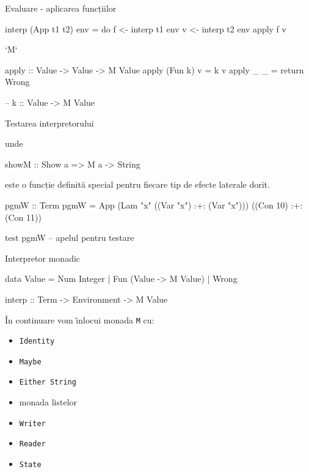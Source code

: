 \documentclass[xcolor=pdftex,romanian,colorlinks]{beamer}
\newcommand{\li}[1]{\lstinline$#1$}
\begin{document}
\begin{frame}[fragile]{Evaluare - aplicarea funcțiilor}


\begin{asciihs}
interp (App t1 t2) env = do
  f <- interp t1 env
  v <- interp t2 env
  apply f v
\end{asciihs}


 `M` 


\begin{asciihs}  
apply :: Value -> Value -> M Value
apply (Fun k) v = k v
apply _ _       = return Wrong

-- k :: Value -> M Value
\end{asciihs}
\end{frame}

\begin{frame}[fragile]{Testarea interpretorului}


unde 

\begin{asciihs}
showM :: Show a => M a -> String
\end{asciihs} 
este o funcție definită special pentru fiecare tip de efecte laterale
dorit.

\pause

\begin{asciihs}
pgmW :: Term
pgmW = App 
          (Lam "x" ((Var "x") :+: (Var "x")))
          ((Con 10) :+:  (Con 11))

test pgmW  -- apelul pentru testare           
\end{asciihs}
\end{frame}

\begin{frame}[fragile]{Interpretor monadic}


\begin{asciihs}
data Value = Num Integer
           | Fun (Value -> M Value)
           | Wrong
           
interp :: Term -> Environment -> M Value           
\end{asciihs}

\medskip

\^{I}n continuare vom \^{\i}nlocui monada \li{M} cu:
\begin{itemize}
\item \li{Identity}
\item \li{Maybe}
\item \li{Either String}
\item monada listelor
\item \li{Writer}
\item \li{Reader}
\item \li{State}
\end{itemize}
\end{frame}          
\end{document}
